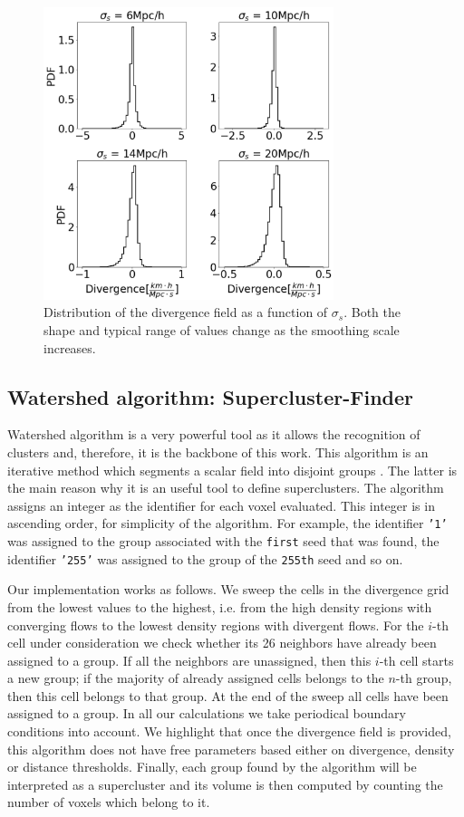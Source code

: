 \documentclass[usenatbib]{mnras}
\begin{document}
\begin{figure}
    \centering
    \includegraphics[width=240pt]{smooth_grad_dist.pdf}
    \caption{Distribution of the divergence field as a function of
      $\sigma_s$.
    Both the shape and typical range of values change as the
    smoothing scale increases.} 
    \label{fig:smooth_grad_dist}
\end{figure}

\subsection{Watershed algorithm: Supercluster-Finder}

Watershed algorithm is a very powerful tool as it allows the recognition of clusters and, therefore, it is the backbone of this work. This algorithm is an iterative method which segments a scalar field into disjoint groups \citep{BeucherWatershed1979}. The latter is the main reason why it is an useful tool to define superclusters.
The algorithm assigns an integer as the identifier for each voxel evaluated. This integer is in ascending order, for simplicity of the algorithm. For example, the identifier \texttt{'1'} was assigned to the group associated with the \texttt{first} seed that was found, the identifier \texttt{'255'} was assigned to the group of the \texttt{255th} seed and so on. 

Our implementation works as follows. 
We sweep the cells in the divergence grid from the lowest values to the highest, i.e. from
the high density regions with converging flows to the lowest density regions with divergent
flows.
For the $i$-th cell under consideration we check whether its 26 neighbors have already been assigned to a group. 
If all the neighbors are unassigned, then this $i$-th cell starts a
new group; if the majority of already assigned cells belongs to the
$n$-th group, then this cell belongs to that group.  
At the end of the sweep all cells have been assigned to a group. 
In all our calculations we take periodical boundary conditions into
account.  
We highlight that once the divergence field is provided, this algorithm
does not have free parameters based either on divergence, density or distance thresholds. Finally, each group found by the algorithm will be interpreted as a supercluster and its volume is then computed by counting the number of voxels which belong to it.
\end{document}
